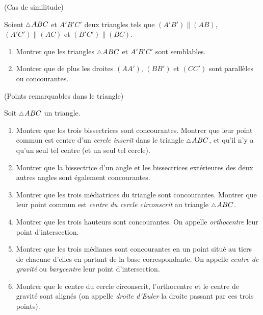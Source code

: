 \documentclass[a4paper,11pt,reqno]{amsart}
\begin{document}
\begin{exo} (Cas de similitude)

  Soient $\tri ABC$ et $A'B'C'$ deux triangles tels que $(A'B') \parallel (AB)$, $(A'C') \parallel (AC)$ et $(B'C') \parallel (BC)$.
  \begin{enumerate}
    \item Montrer que les triangles $\tri ABC$ et $A'B'C'$ sont semblables.
    \item Montrer que de plus les droites $(AA')$, $(BB')$ et $(CC')$ sont parallèles ou concourantes.
  \end{enumerate}

\end{exo}


\begin{exo} (Points remarquables dans le triangle)

  Soit $\tri ABC$ un triangle.
  \begin{enumerate}
    \item Montrer que les trois bissectrices sont concourantes. Montrer que leur point commun est centre d'un \emph{cercle inscrit} dans le triangle $\tri ABC$, et qu'il n'y a qu'un seul tel centre (et un seul tel cercle).
    \item Montrer que la bissectrice d'un angle et les bissectrices extérieures des deux autres angles sont également concourantes.
    \item Montrer que les trois médiatrices du triangle sont concourantes. Montrer que leur point commun est \emph{centre du cercle circonscrit} au triangle $\tri ABC$.
    \item Montrer que les trois hauteurs sont concourantes. On appelle \emph{orthocentre} leur point d'intersection.
    \item Montrer que les trois médianes sont concourantes en un point situé au tiers de chacune d'elles en partant de la base correspondante. On appelle \emph{centre de gravité} ou \emph{barycentre} leur point d'intersection.
    \item Montrer que le centre du cercle circonscrit, l'orthocentre et le centre de gravité sont alignés (on appelle \emph{droite d'Euler} la droite passant par ces trois points). %
  \end{enumerate}
\end{exo}
\end{document}

